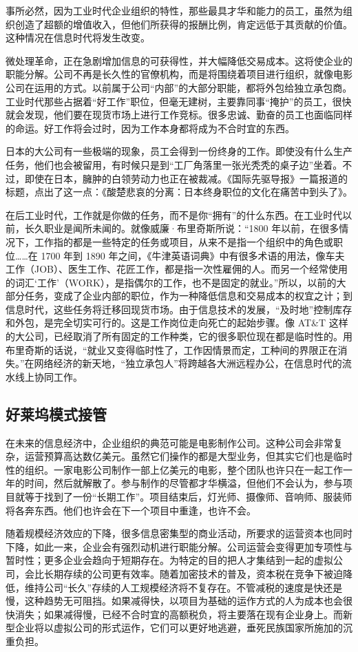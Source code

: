 事所必然，因为工业时代企业组织的特性，那些最具才华和能力的员工，虽然为组织创造了超额的增值收入，但他们所获得的报酬比例，肯定远低于其贡献的价值。这种情况在信息时代将发生改变。

微处理革命，正在急剧增加信息的可获得性，并大幅降低交易成本。这将使企业的职能分解。公司不再是长久性的官僚机构，而是将围绕着项目进行组织，就像电影公司在运用的方式。以前属于公司“内部”的大部分职能，都将外包给独立承包商。工业时代那些占据着“好工作”职位，但毫无建树，主要靠同事“掩护”的员工，很快就会发现，他们要在现货市场上进行工作竞标。很多忠诚、勤奋的员工也面临同样的命运。好工作将会过时，因为工作本身都将成为不合时宜的东西。

日本的大公司有一些极端的现象，员工会得到一份终身的工作。即使没有什么生产任务，他们也会被留用，有时候只是到“工厂角落里一张光秃秃的桌子边”坐着。不过，即使在日本，臃肿的白领劳动力也正在被裁减。《国际先驱导报》一篇报道的标题，点出了这一点：《酸楚悲哀的分离：日本终身职位的文化在痛苦中到头了》。

在后工业时代，工作就是你做的任务，而不是你“拥有”的什么东西。在工业时代以前，长久职业是闻所未闻的。就像威廉·布里奇斯所说：“1800 年以前，在很多情况下，工作指的都是一些特定的任务或项目，从来不是指一个组织中的角色或职位……在 1700 年到 1890 年之间，《牛津英语词典》中有很多术语的用法，像车夫工作（JOB）、医生工作、花匠工作，都是指一次性雇佣的人。而另一个经常使用的词汇‘工作’（WORK），是指偶尔的工作，也不是固定的就业。”所以，以前的大部分任务，变成了企业内部的职位，作为一种降低信息和交易成本的权宜之计；到信息时代，这些任务将迁移回现货市场。由于信息技术的发展，“及时地”控制库存和外包，是完全切实可行的。这是工作岗位走向死亡的起始步骤。像 AT\&T 这样的大公司，已经取消了所有固定的工作种类，它的很多职位现在都是临时性的。用布里奇斯的话说，“就业又变得临时性了，工作因情景而定，工种间的界限正在消失。”在网络经济的新天地，“独立承包人”将跨越各大洲远程办公，在信息时代的流水线上协同工作。

\subsection{好莱坞模式接管}
在未来的信息经济中，企业组织的典范可能是电影制作公司。这种公司会非常复杂，运营预算高达数亿美元。虽然它们操作的都是大型业务，但其实它们也是临时性的组织。一家电影公司制作一部上亿美元的电影，整个团队也许只在一起工作一年的时间，然后就解散了。参与制作的尽管都才华横溢，但他们不会认为，参与项目就等于找到了一份“长期工作”。项目结束后，灯光师、摄像师、音响师、服装师将各奔东西。他们也许会在下一个项目中重逢，也许不会。

随着规模经济效应的下降，很多信息密集型的商业活动，所要求的运营资本也同时下降，如此一来，企业会有强烈动机进行职能分解。公司运营会变得更加专项性与暂时性；更多企业会趋向于短期存在。为特定的目的把人才集结到一起的虚拟公司，会比长期存续的公司更有效率。随着加密技术的普及，资本税在竞争下被迫降低，维持公司“长久”存续的人工规模经济将不复存在。不管减税的速度是快还是慢，这种趋势无可阻挡。如果减得快，以项目为基础的运作方式的人为成本也会很快消失；如果减得慢，已经不合时宜的高额税负，将主要落在现有企业身上。而新型企业将以虚拟公司的形式运作，它们可以更好地逃避，垂死民族国家所施加的沉重负担。

